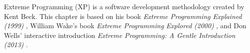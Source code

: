 Extreme Programming (XP) is a software development methodology created by Kent Beck. This chapter is based on his book \textit{Extreme Programming Explained (1999)} \citep{xp:explained}, William Wake's book \textit{Extreme Programming Explored (2000)} \citep{xp:explored}, and Don Wells' interactive introduction \textit{Extreme Programming: A Gentle Introduction (2013)} \citep{xp:online}.
